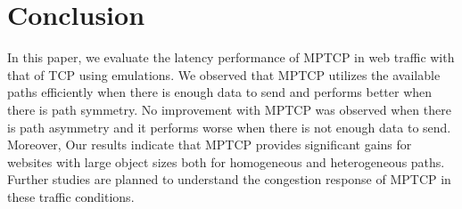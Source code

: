 \section{Conclusion}
\label{sec:conclusion}

In this paper, we evaluate the latency performance of MPTCP in web traffic with that of TCP using emulations. We observed that MPTCP utilizes the 
available paths efficiently when there is enough data to send and performs better when there is path symmetry. No improvement with MPTCP was observed
when there is path asymmetry and it performs worse when there is not enough data to send. Moreover, Our results indicate that MPTCP provides significant gains for websites with large object sizes both for homogeneous and heterogeneous paths. Further studies are planned to understand the congestion response of MPTCP in these traffic conditions. 





